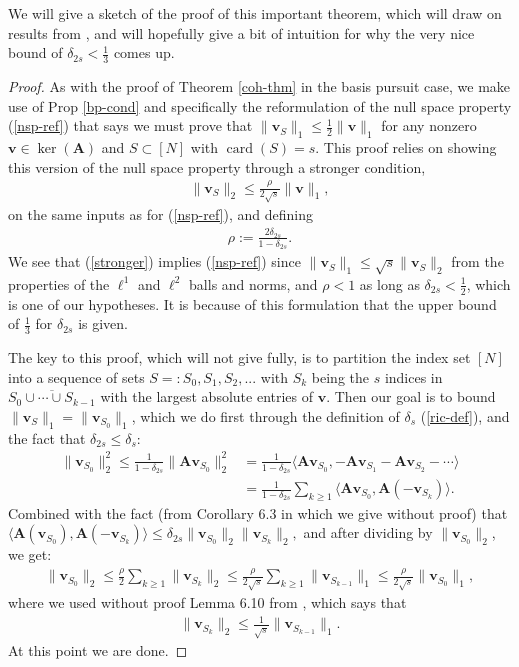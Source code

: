\documentclass[12pt,a4paper]{amsart}
\numberwithin{equation}{section}
\theoremstyle{plain}
\theoremstyle{definition}
\newcommand{\bdv}{\mathbf{v}}
\newcommand{\bdA}{\mathbf{A}}
\DeclareMathOperator{\card}{card}
\begin{document}
We will give a sketch of the proof of this important theorem, which will draw on results from \cite{fou-rau}, and will hopefully give a bit of intuition for why the very nice bound of $\delta_{2s}<\frac{1}{3}$ comes up.

\begin{proof} 
    As with the proof of Theorem \ref{coh-thm} in the basis pursuit case, we make use of Prop \ref{bp-cond} and specifically the reformulation of the null space property (\ref{nsp-ref}) that says we must prove that $\|\bdv_S\|_1\leq\frac{1}{2}\|\bdv\|_1$ for any nonzero $\bdv\in\ker(\bdA)$ and $S\subset[N]$ with $\card(S)=s$. This proof relies on showing this version of the null space property through a stronger condition,
    \begin{align}\label{stronger}
        \|\bdv_S\|_2\leq\frac{\rho}{2\sqrt{s}}\|\bdv\|_1,
    \end{align}
    on the same inputs as for (\ref{nsp-ref}), and defining
    \begin{align*}
        \rho:=\frac{2\delta_{2s}}{1-\delta_{2s}}.
    \end{align*}
    We see that (\ref{stronger}) implies (\ref{nsp-ref}) since $\|\bdv_S\|_1\leq\sqrt{s}\|\bdv_S\|_2$ from the properties of the $\ell^1$ and $\ell^2$ balls and norms, and $\rho<1$ as long as $\delta_{2s}<\frac{1}{2}$, which is one of our hypotheses. It is because of this formulation that the upper bound of $\frac{1}{3}$ for $\delta_{2s}$ is given.
    
    The key to this proof, which will not give fully, is to partition the index set $[N]$ into a sequence of sets $S=:S_0,S_1,S_2,...$ with $S_k$ being the $s$ indices in $\overline{S_0\cup\cdots\cup S_{k-1}}$ with the largest absolute entries of $\bdv$. Then our goal is to bound $\|\bdv_S\|_1=\|\bdv_{S_0}\|_1$, which we do first through the definition of $\delta_s$ (\ref{ric-def}), and the fact that $\delta_{2s}\leq\delta_s$:
    \begin{align*}
        \|\bdv_{S_0}\|^2_2\leq\frac{1}{1-\delta_{2s}}\|\bdA\bdv_{S_0}\|^2_2&=\frac{1}{1-\delta_{2s}}\langle\bdA\bdv_{S_0},-\bdA\bdv_{S_1}-\bdA\bdv_{S_2}-\cdots\rangle\\&=\frac{1}{1-\delta_{2s}}\sum_{k\geq1}\langle\bdA\bdv_{S_0},\bdA(-\bdv_{S_k})\rangle.
    \end{align*}
    Combined with the fact (from Corollary 6.3 in \cite{fou-rau} which we give without proof) that $\langle\bdA(\bdv_{S_0}),\bdA(-\bdv_{S_k})\rangle\leq\delta_{2s}\|\bdv_{S_0}\|_2\|\bdv_{S_k}\|_2,$ and after dividing by $\|\bdv_{S_0}\|_2$, we get:
    \begin{align*}
        \|\bdv_{S_0}\|_2\leq\frac{\rho}{2}\sum_{k\geq1}\|\bdv_{S_k}\|_2\leq\frac{\rho}{2\sqrt{s}}\sum_{k\geq1}\|\bdv_{S_{k-1}}\|_1\leq\frac{\rho}{2\sqrt{s}}\|\bdv_{S_0}\|_1,
    \end{align*}
    where we used without proof Lemma 6.10 from \cite{fou-rau}, which says that 
    \begin{align*}\|\bdv_{S_k}\|_2\leq\frac{1}{\sqrt{s}}\|\bdv_{S_{k-1}}\|_1.
    \end{align*}
    At this point we are done.
    
\end{proof}
\end{document}
